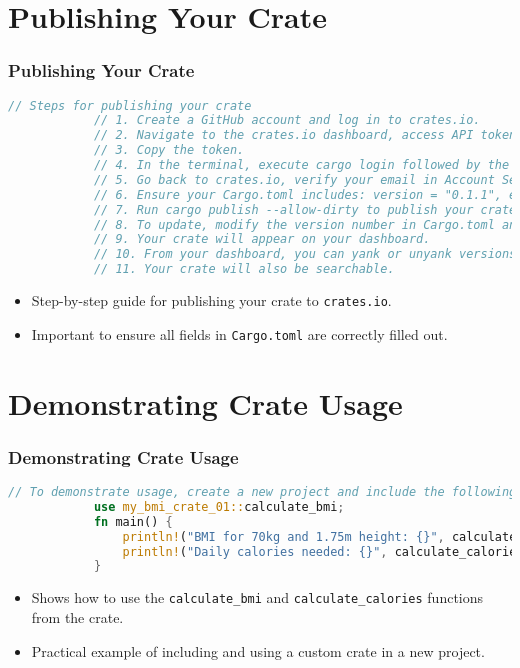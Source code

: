 \documentclass[aspectratio=169, table]{beamer}
\begin{document}
	\section{Publishing Your Crate}
	\begin{frame}[fragile]
		\frametitle{Publishing Your Crate}
		\begin{lstlisting}[language=Rust]
			// Steps for publishing your crate
			// 1. Create a GitHub account and log in to crates.io.
			// 2. Navigate to the crates.io dashboard, access API tokens, and create a new token.
			// 3. Copy the token.
			// 4. In the terminal, execute cargo login followed by the token from crates.io.
			// 5. Go back to crates.io, verify your email in Account Settings -> Profile -> Email -> Save.
			// 6. Ensure your Cargo.toml includes: version = "0.1.1", edition = "2021", authors = ["Your Name"], description = "Fitness calculation utilities", license = "MIT".
			// 7. Run cargo publish --allow-dirty to publish your crate.
			// 8. To update, modify the version number in Cargo.toml and run the publish command again.
			// 9. Your crate will appear on your dashboard.
			// 10. From your dashboard, you can yank or unyank versions to control downloads.
			// 11. Your crate will also be searchable.
		\end{lstlisting}
		\begin{itemize}
			\item Step-by-step guide for publishing your crate to \texttt{crates.io}.
			\item Important to ensure all fields in \texttt{Cargo.toml} are correctly filled out.
		\end{itemize}
	\end{frame}
	
	\section{Demonstrating Crate Usage}
	\begin{frame}[fragile]
		\frametitle{Demonstrating Crate Usage}
		\begin{lstlisting}[language=Rust]
			// To demonstrate usage, create a new project and include the following crate:
			use my_bmi_crate_01::calculate_bmi; 
			fn main() {
				println!("BMI for 70kg and 1.75m height: {}", calculate_bmi(70.0, 1.75));
				println!("Daily calories needed: {}", calculate_calories(1500.0, 1.2));
			}
		\end{lstlisting}
		\begin{itemize}
			\item Shows how to use the \texttt{calculate\_bmi} and \texttt{calculate\_calories} functions from the crate.
			\item Practical example of including and using a custom crate in a new project.
		\end{itemize}
	\end{frame}
	
\end{document}
